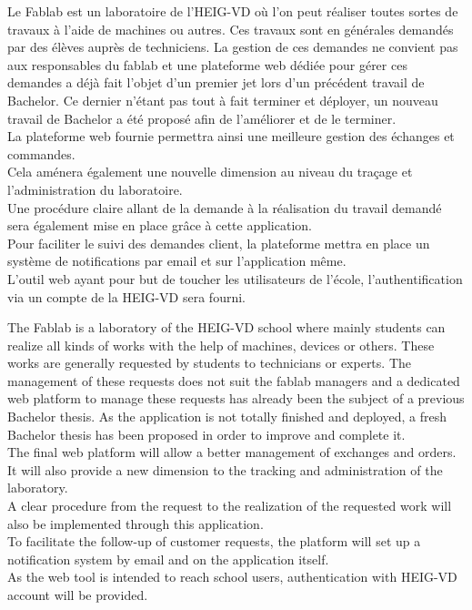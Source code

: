 Le Fablab est un laboratoire de l'HEIG-VD où l'on peut réaliser toutes sortes de travaux à l'aide de machines ou autres. Ces travaux sont en générales demandés par des élèves auprès de techniciens. La gestion de ces demandes ne convient pas aux responsables du fablab et une plateforme web dédiée pour gérer ces demandes a déjà fait l'objet d'un premier jet lors d'un précédent travail de Bachelor. Ce dernier n'étant pas tout à fait terminer et déployer, un nouveau travail de Bachelor a été proposé afin de l'améliorer et de le terminer.\\
La plateforme web fournie permettra ainsi une meilleure gestion des échanges et commandes.\\
Cela aménera également une nouvelle dimension au niveau du traçage et l'administration du laboratoire.\\
Une procédure claire allant de la demande à la réalisation du travail demandé sera également mise en place grâce à cette application.\\
Pour faciliter le suivi des demandes client, la plateforme mettra en place un système de notifications par email et sur l'application même.\\
L'outil web ayant pour but de toucher les utilisateurs de l'école, l'authentification via un compte de la HEIG-VD sera fourni.\\

\asterism

The Fablab is a laboratory of the HEIG-VD school where mainly students can realize all kinds of works with the help of machines, devices or others. These works are generally requested by students to technicians or experts. The management of these requests does not suit the fablab managers and a dedicated web platform to manage these requests has already been the subject of a previous Bachelor thesis. As the application is not totally finished and deployed, a fresh Bachelor thesis has been proposed in order to improve and complete it.\\
The final web platform will allow a better management of exchanges and orders.\\
It will also provide a new dimension to the tracking and administration of the laboratory.\\
A clear procedure from the request to the realization of the requested work will also be implemented through this application.\\
To facilitate the follow-up of customer requests, the platform will set up a notification system by email and on the application itself.\\
As the web tool is intended to reach school users, authentication with HEIG-VD account will be provided.\\